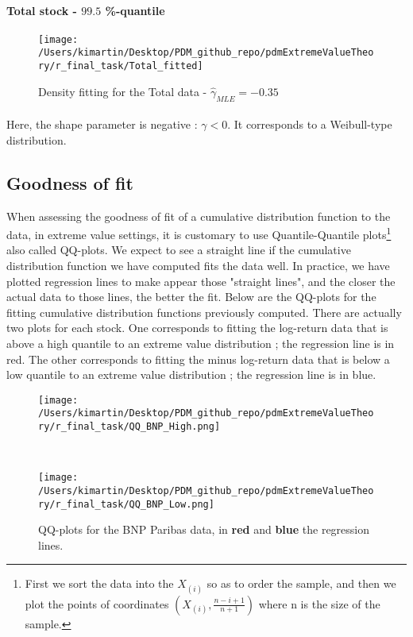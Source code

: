 \paragraph{Total stock - $99.5$ \%-quantile}
\begin{figure}[h!]
	\centering
	\texttt{[image: /Users/kimartin/Desktop/PDM\_github\_repo/pdmExtremeValueTheory/r\_final\_task/Total\_fitted]}
	\caption{Density fitting for the Total data - $\hat{\gamma}_{MLE} = -0.35$}
	\label{fig:dataAboveThresholdTotalFitted}
\end{figure}
\paragraph{}
Here, the shape parameter is negative : $\gamma < 0$. It corresponds to a Weibull-type distribution. 
\subsection{Goodness of fit}
When assessing the goodness of fit of a cumulative distribution function to the data, in extreme value settings, it is customary to use Quantile-Quantile plots\footnote{First we sort the data into the $X_{(i)}$ so as to order the sample, and then we plot the points of coordinates $(X_{(i)}, \frac{n - i + 1}{n + 1})$ where n is the size of the sample.} also called QQ-plots. We expect to see a straight line if the cumulative distribution function we have computed fits the data well. In practice, we have plotted regression lines to make appear those "straight lines", and the closer the actual data to those lines, the better the fit. Below are the QQ-plots for the fitting cumulative distribution functions previously computed. There are actually two plots for each stock. One corresponds to fitting the log-return data that is above a high quantile to an extreme value distribution ; the regression line is in red. The other corresponds to fitting the minus log-return data that is below a low quantile to an extreme value distribution ; the regression line is in blue.
\begin{figure}[h!]
	\centering
	\begin{minipage}[b]{0.4\textwidth}
		\centering
		\texttt{[image: /Users/kimartin/Desktop/PDM\_github\_repo/pdmExtremeValueTheory/r\_final\_task/QQ\_BNP\_High.png]}
		\label{fig:QQBNP1}
	\end{minipage}
	~
	\begin{minipage}[b]{0.4\textwidth}
		\centering
		\texttt{[image: /Users/kimartin/Desktop/PDM\_github\_repo/pdmExtremeValueTheory/r\_final\_task/QQ\_BNP\_Low.png]}
		\label{fig:QQBNP2}
	\end{minipage}
	\caption{QQ-plots for the BNP Paribas data, in \textbf{red} and \textbf{blue} the regression lines.}
\end{figure}
